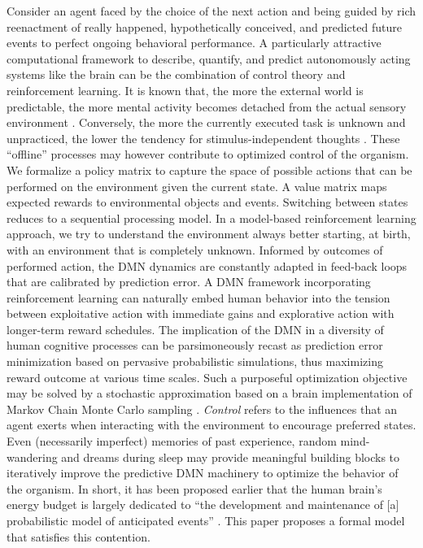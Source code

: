 \documentclass{article} %
\begin{document}
Consider an agent faced by the choice of the next action
and being guided by rich
reenactment of really happened, hypothetically conceived, and
predicted future events to perfect ongoing behavioral performance.
A particularly attractive computational framework
to describe, quantify, and predict autonomously acting systems like the brain
can be the combination of control theory and reinforcement learning.
It is known that, the more the external world is predictable,
the more mental activity becomes detached from the actual sensory environment
\citep{antrobus1966studies, pope1978regulation}.
Conversely,
the more the currently executed task is unknown and unpracticed,
the lower the tendency for stimulus-independent thoughts
\citep{filler1973daydreaming, teasdale1995stimulus}.
These ``offline'' processes may however contribute to optimized control of the organism.
We formalize
a policy matrix to capture the space of possible actions that can be performed
on the environment given the current state. A value matrix
maps expected rewards to environmental objects and events.
Switching between states reduces to a sequential processing model.
In a model-based reinforcement learning approach,
we try to understand the environment always better
starting, at birth, with an environment that is completely unknown.
Informed by outcomes of performed action,
the DMN dynamics are constantly adapted in feed-back loops
that are calibrated by prediction error.
A DMN framework incorporating reinforcement learning
can naturally embed human behavior
into the tension between exploitative action with immediate gains and
explorative action with longer-term reward schedules.
The implication of the DMN in a diversity of human cognitive processes
can be parsimoneously recast as prediction error minimization
based on pervasive probabilistic simulations,
thus maximizing reward outcome at various time scales.
Such a purposeful optimization objective
may be solved by a stochastic approximation
based on a brain implementation of Markov Chain Monte Carlo sampling
\citep{tenenbaum2011grow}.
\textit{Control} refers to the influences that an agent exerts when interacting
with the environment to encourage preferred states.
Even (necessarily imperfect) memories
of past experience, random mind-wandering and dreams during sleep
may provide meaningful building blocks to iteratively improve
the predictive DMN machinery to optimize the behavior of the organism.
%
In short, it has been proposed earlier that
the human brain's energy budget is largely dedicated to
``the development and maintenance of [a]
probabilistic model of anticipated events''
\citep{raichle2005intrinsic}.
This paper proposes a formal model that
satisfies this contention.
\end{document}
